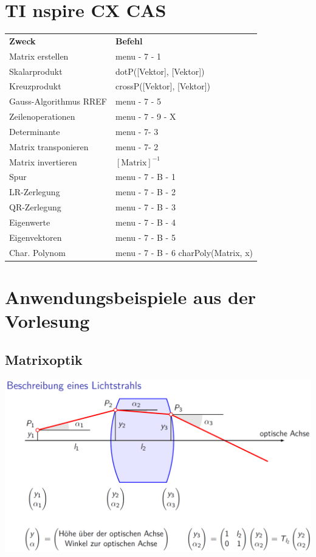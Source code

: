     
		 \section{TI nspire CX CAS}
		 \begin{tabular}{ll}
		 \textbf{Zweck} & \textbf{Befehl} \\
		 Matrix erstellen & menu - 7 - 1 \\ 
		 Skalarprodukt & dotP([Vektor], [Vektor])\\
		 Kreuzprodukt  & crossP([Vektor], [Vektor])\\
		 Gauss-Algorithmus RREF & menu - 7 - 5\\
		 Zeilenoperationen & menu - 7 - 9 - X \\
		 Determinante & menu - 7- 3\\
		 Matrix transponieren &  menu - 7- 2\\
		 Matrix invertieren & $[\text{Matrix}]^{-1}$ \\
		 Spur & menu - 7 - B - 1 \\
		 LR-Zerlegung & menu - 7 - B - 2 \\
		 QR-Zerlegung & menu - 7 - B - 3 \\
		 Eigenwerte & menu - 7 - B - 4 \\
		 Eigenvektoren & menu - 7 - B - 5 \\
		 Char. Polynom & menu - 7 - B - 6 \quad charPoly(Matrix, x) 
		 \end{tabular}
		    
		    
		    
		    
		    
		 \section{Anwendungsbeispiele aus der Vorlesung}
		 
		 \subsection{Matrixoptik}
		 
		 \includegraphics[width=0.85\linewidth]{Bilder/matrixoptik1} \\
		 
